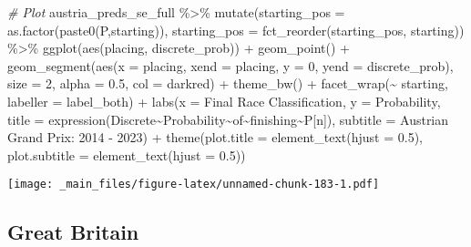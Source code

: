 \documentclass[
]{book}
\newenvironment{Shaded}{\begin{snugshade}}{\end{snugshade}}
\newcommand{\AttributeTok}[1]{\textcolor[rgb]{0.77,0.63,0.00}{#1}}
\newcommand{\CommentTok}[1]{\textcolor[rgb]{0.56,0.35,0.01}{\textit{#1}}}
\newcommand{\DecValTok}[1]{\textcolor[rgb]{0.00,0.00,0.81}{#1}}
\newcommand{\FloatTok}[1]{\textcolor[rgb]{0.00,0.00,0.81}{#1}}
\newcommand{\FunctionTok}[1]{\textcolor[rgb]{0.00,0.00,0.00}{#1}}
\newcommand{\NormalTok}[1]{#1}
\newcommand{\SpecialCharTok}[1]{\textcolor[rgb]{0.00,0.00,0.00}{#1}}
\newcommand{\StringTok}[1]{\textcolor[rgb]{0.31,0.60,0.02}{#1}}
\begin{document}
\begin{Shaded}
\begin{Highlighting}[]
\CommentTok{\# Plot}
\NormalTok{austria\_preds\_se\_full }\SpecialCharTok{\%\textgreater{}\%}
  \FunctionTok{mutate}\NormalTok{(}\AttributeTok{starting\_pos =} \FunctionTok{as.factor}\NormalTok{(}\FunctionTok{paste0}\NormalTok{(}\StringTok{\textquotesingle{}P\textquotesingle{}}\NormalTok{,starting)),}
         \AttributeTok{starting\_pos =} \FunctionTok{fct\_reorder}\NormalTok{(starting\_pos, starting)) }\SpecialCharTok{\%\textgreater{}\%}
  \FunctionTok{ggplot}\NormalTok{(}\FunctionTok{aes}\NormalTok{(placing, discrete\_prob)) }\SpecialCharTok{+}
  \FunctionTok{geom\_point}\NormalTok{() }\SpecialCharTok{+}
  \FunctionTok{geom\_segment}\NormalTok{(}\FunctionTok{aes}\NormalTok{(}\AttributeTok{x =}\NormalTok{ placing, }\AttributeTok{xend =}\NormalTok{ placing, }\AttributeTok{y =} \DecValTok{0}\NormalTok{, }\AttributeTok{yend =}\NormalTok{ discrete\_prob),}
               \AttributeTok{size =} \DecValTok{2}\NormalTok{, }\AttributeTok{alpha =} \FloatTok{0.5}\NormalTok{, }\AttributeTok{col =} \StringTok{\textquotesingle{}darkred\textquotesingle{}}\NormalTok{) }\SpecialCharTok{+}
  \FunctionTok{theme\_bw}\NormalTok{() }\SpecialCharTok{+}
  \FunctionTok{facet\_wrap}\NormalTok{(}\SpecialCharTok{\textasciitilde{}}\NormalTok{ starting, }\AttributeTok{labeller =}\NormalTok{ label\_both) }\SpecialCharTok{+}
  \FunctionTok{labs}\NormalTok{(}\AttributeTok{x =} \StringTok{\textquotesingle{}Final Race Classification\textquotesingle{}}\NormalTok{,}
       \AttributeTok{y =} \StringTok{\textquotesingle{}Probability\textquotesingle{}}\NormalTok{,}
       \AttributeTok{title =} \FunctionTok{expression}\NormalTok{(Discrete}\SpecialCharTok{\textasciitilde{}}\NormalTok{Probability}\SpecialCharTok{\textasciitilde{}}\NormalTok{of}\SpecialCharTok{\textasciitilde{}}\NormalTok{finishing}\SpecialCharTok{\textasciitilde{}}\NormalTok{P[n]),}
       \AttributeTok{subtitle =} \StringTok{\textquotesingle{}Austrian Grand Prix: 2014 {-} 2023\textquotesingle{}}\NormalTok{) }\SpecialCharTok{+}
  \FunctionTok{theme}\NormalTok{(}\AttributeTok{plot.title =} \FunctionTok{element\_text}\NormalTok{(}\AttributeTok{hjust =} \FloatTok{0.5}\NormalTok{),}
        \AttributeTok{plot.subtitle =} \FunctionTok{element\_text}\NormalTok{(}\AttributeTok{hjust =} \FloatTok{0.5}\NormalTok{)) }
\end{Highlighting}
\end{Shaded}

\texttt{[image: \_main\_files/figure-latex/unnamed-chunk-183-1.pdf]}

\hypertarget{great-britain}{%
\subsection{Great Britain}\label{great-britain}}
\end{document}
